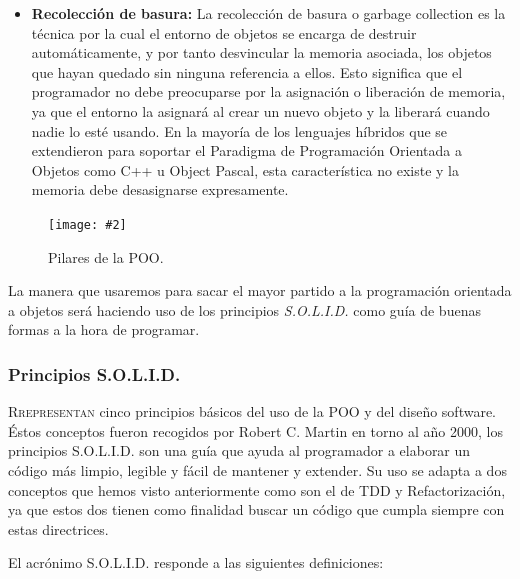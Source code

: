 \documentclass[12pt,a4paper,spanish]{book} %
\newcommand{\imgCentradaMed}[3]{
\begin{figure}[H]
\begin{center}
\texttt{[image: \#2]}
\caption{#3}
\label{#1}
\end{center}
\end{figure}
}
\begin{document}
\begin{itemize}
\item\textbf{Recolección de basura:} La recolección de basura o garbage collection es la técnica por la cual el entorno de objetos se encarga de destruir automáticamente, y por tanto desvincular la memoria asociada, los objetos que hayan quedado sin ninguna referencia a ellos. Esto significa que el programador no debe preocuparse por la asignación o liberación de memoria, ya que el entorno la asignará al crear un nuevo objeto y la liberará cuando nadie lo esté usando. En la mayoría de los lenguajes híbridos que se extendieron para soportar el Paradigma de Programación Orientada a Objetos como C++ u Object Pascal, esta característica no existe y la memoria debe desasignarse expresamente.
\end{itemize}

\imgCentradaMed{fig.2.5}{img/poo.eps}{Pilares de la POO.}

La manera que usaremos para sacar el mayor partido a la programación orientada a objetos será haciendo uso de los principios \emph{S.O.L.I.D.} como guía de buenas formas a la hora de programar.

\newpage
\subsubsection{Principios S.O.L.I.D.}

\lettrine{R}{representan} cinco principios básicos del uso de la POO y del diseño software. Éstos conceptos fueron recogidos por Robert C. Martin en torno al año 2000, los principios S.O.L.I.D. son una guía que ayuda al programador a elaborar un código más limpio, legible y fácil de mantener y extender. Su uso se adapta a dos conceptos que hemos visto anteriormente como son el de TDD y Refactorización, ya que estos dos tienen como finalidad buscar un código que cumpla siempre con estas directrices.

El acrónimo S.O.L.I.D. responde a las siguientes definiciones:
\end{document}
